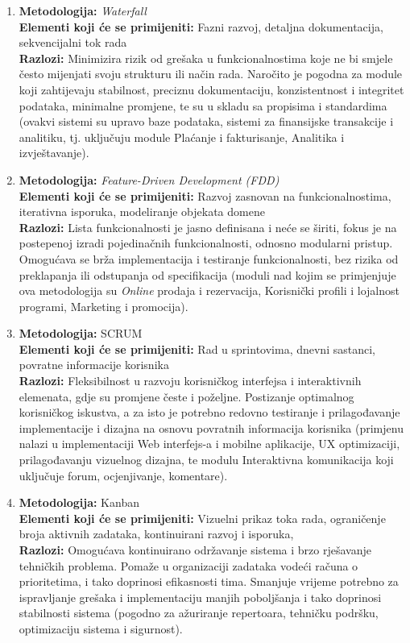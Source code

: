\begin{enumerate}
    \item \textbf{Metodologija:} \textit{Waterfall} \\
    \textbf{Elementi koji će se primijeniti:} Fazni razvoj, detaljna dokumentacija, sekvencijalni tok rada \\
    \textbf{Razlozi:} Minimizira rizik od grešaka u funkcionalnostima koje ne bi smjele često mijenjati svoju strukturu ili način rada. Naročito je pogodna za module koji zahtijevaju stabilnost, preciznu dokumentaciju, konzistentnost i integritet podataka, minimalne promjene, te su u skladu sa propisima i standardima (ovakvi sistemi su upravo baze podataka, sistemi za finansijske transakcije i analitiku, tj. uključuju module Plaćanje i fakturisanje, Analitika i izvještavanje).

    \item \textbf{Metodologija:} \textit{Feature-Driven Development (FDD)} \\
    \textbf{Elementi koji će se primijeniti:} Razvoj zasnovan na funkcionalnostima, iterativna isporuka, modeliranje objekata domene\\
    \textbf{Razlozi:} Lista funkcionalnosti je jasno definisana i neće se širiti, fokus je na postepenoj izradi pojedinačnih funkcionalnosti, odnosno modularni pristup. Omogućava se brža implementacija i testiranje funkcionalnosti, bez rizika od preklapanja ili odstupanja od specifikacija (moduli nad kojim se primjenjuje ova metodologija su \textit{Online} prodaja i rezervacija, Korisnički profili i lojalnost programi, Marketing i promocija).

    \item \textbf{Metodologija:} SCRUM \\
    \textbf{Elementi koji će se primijeniti:} Rad u sprintovima, dnevni sastanci, povratne informacije korisnika \\
    \textbf{Razlozi:} Fleksibilnost u razvoju korisničkog interfejsa i interaktivnih elemenata, gdje su promjene česte i poželjne. Postizanje optimalnog korisničkog iskustva, a za isto je potrebno redovno testiranje i prilagođavanje implementacije i dizajna na osnovu povratnih informacija korisnika (primjenu nalazi u implementaciji Web interfejs-a i mobilne aplikacije, UX optimizaciji, prilagođavanju vizuelnog dizajna, te modulu Interaktivna komunikacija koji uključuje forum, ocjenjivanje, komentare).

    \item \textbf{Metodologija:} Kanban \\
    \textbf{Elementi koji će se primijeniti:} Vizuelni prikaz toka rada, ograničenje broja aktivnih zadataka, kontinuirani razvoj i isporuka, \\
    \textbf{Razlozi:} Omogućava kontinuirano održavanje sistema i brzo rješavanje tehničkih problema. Pomaže u organizaciji zadataka vodeći računa o prioritetima, i tako doprinosi efikasnosti tima. Smanjuje vrijeme potrebno za ispravljanje grešaka i implementaciju manjih poboljšanja i tako doprinosi stabilnosti sistema (pogodno za ažuriranje repertoara, tehničku podršku, optimizaciju sistema i sigurnost).
\end{enumerate}
